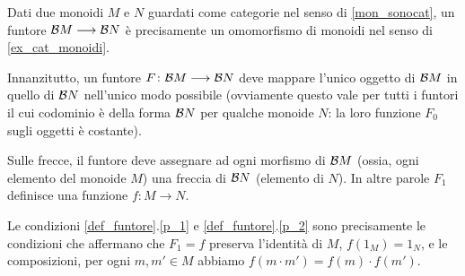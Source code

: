 \begin{example}\label{exa_funtori_da_gruppi}
 Dati due monoidi \(M\) e \(N\) guardati come categorie nel senso di \ref{mon_sonocat}, un funtore \(\mathcal{B} M\longrightarrow \mathcal{B} N\) è precisamente un omomorfismo di monoidi nel senso di \ref{ex_cat_monoidi}.

 Innanzitutto, un funtore \(F \colon \mathcal{B} M\longrightarrow \mathcal{B} N\) deve mappare l'unico oggetto di \(\mathcal{B} M\) in quello di \(\mathcal{B} N\) nell'unico modo possibile (ovviamente questo vale per tutti i funtori il cui codominio è della forma \(\mathcal{B} N\) per qualche monoide \(N\): la loro funzione \(F_0\) sugli oggetti è costante).

 Sulle frecce, il funtore deve assegnare ad ogni morfismo di \(\mathcal{B} M\) (ossia, ogni elemento del monoide \(M\)) una freccia di \(\mathcal{B} N\) (elemento di \(N\)). In altre parole \(F_1\) definisce una funzione \(f\colon M\to N\).

 Le condizioni \ref{def_funtore}.\ref{p_1} e \ref{def_funtore}.\ref{p_2} sono precisamente le condizioni che affermano che \(F_1=f\) preserva l'identità di \(M\), \(f(1_M)=1_N\), e le composizioni, per ogni \(m,m'\in M\) abbiamo \(f(m\cdot m')=f(m)\cdot f(m')\).
\end{example}
